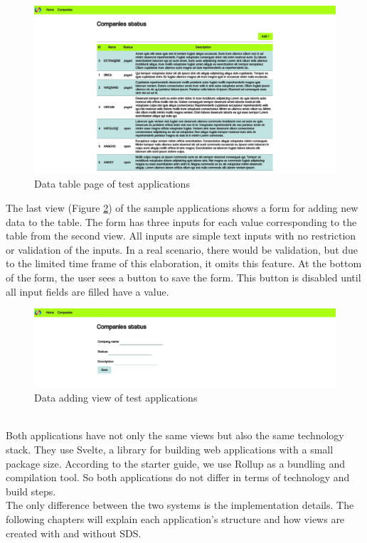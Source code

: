 \begin{figure}[htbp]
    \centerline{\includegraphics[width=\linewidth, draft=false]{images/demo_view_data_table.png}}
    \caption{Data table page of test applications}
    \label{data_table}
    \end{figure}
The last view (Figure \ref{adding_form}) of the sample applications shows a form for adding new data to the table. The form has three inputs for each value corresponding to the table from the second view. All inputs are simple text inputs with no restriction or validation of the inputs. In a real scenario, there would be validation, but due to the limited time frame of this elaboration, it omits this feature. At the bottom of the form, the user sees a button to save the form. This button is disabled until all input fields are filled have a value. 
\begin{figure}[htbp]
    \centerline{\includegraphics[width=\linewidth, draft=false]{images/demo_view_form.png}}
    \caption{Data adding view of test applications}
    \label{adding_form}
    \end{figure}
\\
Both applications have not only the same views but also the same technology stack. They use Svelte, a library for building web applications with a small package size. According to the starter guide, we use Rollup as a bundling and compilation tool. So both applications do not differ in terms of technology and build steps. \cite{svelte_svelte_nodate} \\
The only difference between the two systems is the implementation details. The following chapters will explain each application's structure and how views are created with and without \ac{SDS}.
